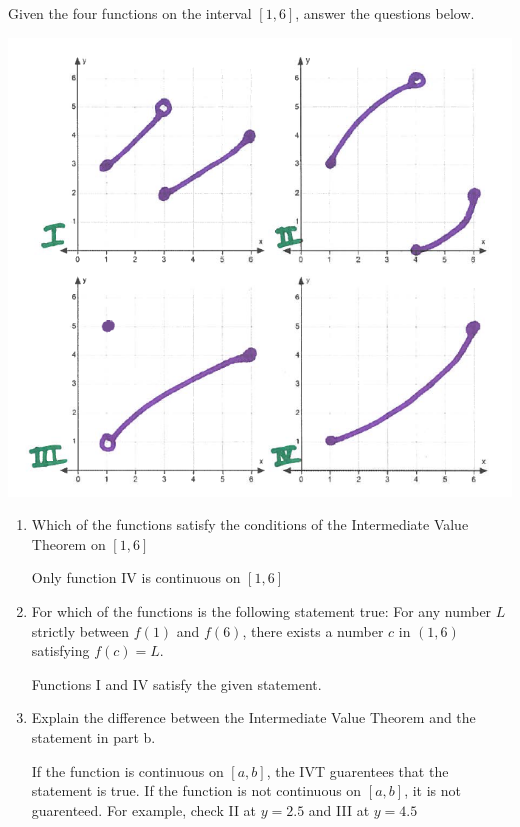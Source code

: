 \documentclass[nooutcomes,handout]{ximera}
\begin{document}
\begin{problem}
	Given the four functions on the interval $[1,6]$, answer the questions below.
	
	\begin{image}
	\includegraphics[scale=.5]{Figure2.png}
	\end{image}

	\begin{enumerate}
	\item Which of the functions satisfy the conditions of the Intermediate Value Theorem on $[1,6]$
		\begin{freeResponse}
		Only function IV is continuous on $[1,6]$
		\end{freeResponse}
	\item For which of the functions is the following statement true:  For any number $L$ strictly between $f(1)$ and $f(6)$, there exists a number $c$ in $(1,6)$ satisfying $f(c)=L$.
		\begin{freeResponse}
		Functions I and IV satisfy the given statement.
		\end{freeResponse}
	\item Explain the difference between the Intermediate Value Theorem and the statement in part b.
		\begin{freeResponse}
		If the function is continuous on $[a,b]$, the IVT guarentees that the statement is true.  If the function is not continuous on $[a,b]$, it is not guarenteed.  For example, check II at $y=2.5$ and III at $y=4.5$
		\end{freeResponse}

	\end{enumerate}
\end{problem}
\end{document}
